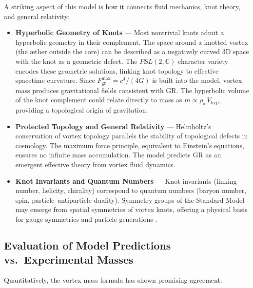 \documentclass[11pt]{article}
\begin{document}
    A striking aspect of this model is how it connects fluid mechanics, knot theory, and general relativity:

    \begin{itemize}
        \item \textbf{Hyperbolic Geometry of Knots} — Most nontrivial knots admit a hyperbolic geometry in their complement. The space around a knotted vortex (the æther outside the core) can be described as a negatively curved 3D space with the knot as a geometric defect. The $PSL(2,\mathbb{C})$ character variety encodes these geometric solutions, linking knot topology to effective spacetime curvature. Since $F^{\max}_{\text{gr}} = c^4/(4G)$ is built into the model, vortex mass produces gravitational fields consistent with GR. The hyperbolic volume of the knot complement could relate directly to mass as $m \propto \rho_{\text{\ae}} V_{\text{hyp}}$, providing a topological origin of gravitation.

        \item \textbf{Protected Topology and General Relativity} — Helmholtz’s conservation of vortex topology parallels the stability of topological defects in cosmology. The maximum force principle, equivalent to Einstein’s equations, ensures no infinite mass accumulation. The model predicts GR as an emergent effective theory from vortex fluid dynamics.

        \item \textbf{Knot Invariants and Quantum Numbers} — Knot invariants (linking number, helicity, chirality) correspond to quantum numbers (baryon number, spin, particle–antiparticle duality). Symmetry groups of the Standard Model may emerge from spatial symmetries of vortex knots, offering a physical basis for gauge symmetries and particle generations \cite{Iskandarani2025f,Avrin2012}.
    \end{itemize}

    \subsection{Evaluation of Model Predictions vs.\ Experimental Masses}

    Quantitatively, the vortex mass formula has shown promising agreement:
\end{document}
